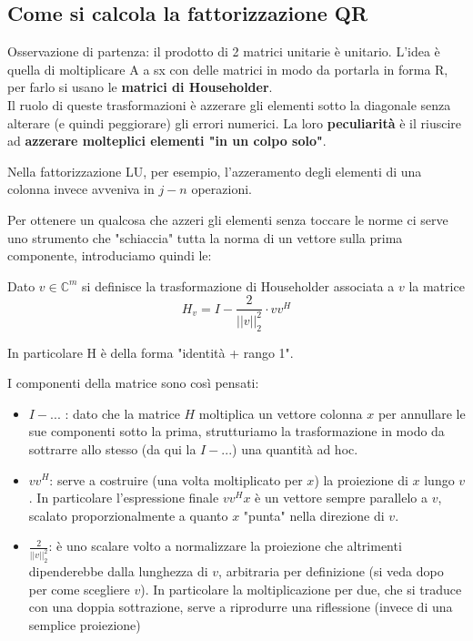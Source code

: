 \documentclass[12pt,a4paper,]{report}
\begin{document}
\subsection{Come si calcola la fattorizzazione QR}
Osservazione di partenza: il prodotto di 2 matrici unitarie è unitario.
\medbreak
\noindent
L'idea è quella di moltiplicare A a sx con delle matrici in modo da portarla in forma R, per farlo si usano le \textbf{matrici di Householder}.\\
Il ruolo di queste trasformazioni è azzerare gli elementi sotto la diagonale senza alterare (e quindi peggiorare) gli errori numerici.
La loro \textbf{peculiarità} è il riuscire ad \textbf{azzerare molteplici elementi "in un colpo solo"}.
\begin{nota}
    Nella fattorizzazione LU, per esempio, l'azzeramento degli elementi di una colonna invece avveniva in $j-n$ operazioni.
\end{nota}
Per ottenere un qualcosa che azzeri gli elementi senza toccare le norme ci serve uno strumento che "schiaccia" tutta la norma di un vettore sulla prima componente, introduciamo quindi le:
\begin{definizione}
    Dato $v\in\mathbb{C}^m$ si definisce la trasformazione di Householder associata a $v$ la matrice
    \[
    H_v = I -  \frac{2}{||v||^2_2}\cdot vv^H
    \]
    \begin{nota}
        In particolare H è della forma "identità + rango 1".
    \end{nota}
    \noindent
    I componenti della matrice sono così pensati:
    \begin{itemize}
        \item $I-...$ : dato che la matrice $H$ moltiplica un vettore colonna $x$ per annullare le sue componenti sotto la prima, strutturiamo la trasformazione in modo da sottrarre allo stesso (da qui la $I-...$) una quantità ad hoc.
        \item $vv^H$: serve a costruire (una volta moltiplicato per $x$) la proiezione di $x$ lungo $v$.
        In particolare l'espressione finale $vv^Hx$  è un vettore sempre parallelo a $v$, scalato proporzionalmente a quanto $x$ "punta" nella direzione di $v$. 
        \item $\frac{2}{||v||^2_2}$: è uno scalare volto a normalizzare la proiezione che altrimenti dipenderebbe dalla lunghezza di $v$, arbitraria per definizione (si veda dopo per come scegliere $v$).
        In particolare la moltiplicazione per due, che si traduce con una doppia sottrazione, serve a riprodurre una riflessione (invece di una semplice proiezione)
    \end{itemize}
\end{definizione}
\end{document}
